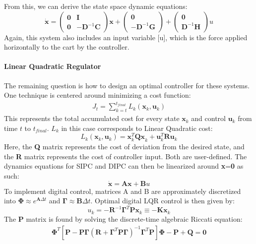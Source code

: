 \documentclass{article}
\theoremstyle{plain}
\theoremstyle{definition}
\theoremstyle{remark}
\begin{document}
From this, we can derive the state space dynamic equations:
\begin{equation}
    \label{DIPC_ODE}
    \dot{\textbf{x}} = \begin{pmatrix}
        \textbf{0} & \textbf{I} \\
        \textbf{0} & -\textbf{D}^{-1}\textbf{C}
    \end{pmatrix}\textbf{x} + \begin{pmatrix}
        \textbf{0} \\
        -\textbf{D}^{-1}\textbf{G}
    \end{pmatrix} + \begin{pmatrix}
        \textbf{0} \\
        \textbf{D}^{-1}\textbf{H}
    \end{pmatrix}u
\end{equation}
Again, this system also includes an input variable [u], which is the force applied horizontally to the cart by the controller.

\paragraph{Linear Quadratic Regulator}
The remaining question is how to design an optimal controller for these systems. One technique is centered around minimizing a cost function:
\begin{gather*}
    J_t=\sum_{k=t}^{t_{final}}L_k(\textbf{x}_k, \textbf{u}_k)
\end{gather*}
This represents the total accumulated cost for every state $\textbf{x}_k$ and control $\textbf{u}_k$ from time $t$ to $t_{final}$. $L_k$ in this case corresponds to Linear Quadratic cost:
\begin{equation}
    \label{LQR_cost}
    L_k(\textbf{x}_k,\textbf{u}_k) = \textbf{x}_k^T\textbf{Qx}_k+\textbf{u}_k^T\textbf{Ru}_k
\end{equation}
Here, the \textbf{Q} matrix represents the cost of deviation from the desired state, and the \textbf{R} matrix represents the cost of controller input. Both are user-defined. The dynamics equations for SIPC and DIPC can then be linearized around \textbf{x}=\textbf{0} as such:
\begin{equation}
    \label{LQR_lin}
    \dot{\textbf{x}}=\textbf{Ax}+\textbf{B}u
\end{equation}
To implement digital control, matrices A and B are approximately discretized into $\boldsymbol\Phi\approx e^{\textbf{A}\Delta t}$ and $\boldsymbol\Gamma\approx\textbf{B}\Delta t$. Optimal digital LQR control is then given by:
\begin{equation}
    \label{LQR_ctrl}
    u_k = -\textbf{R}^{-1}\boldsymbol\Gamma^T\textbf{Px}_k\equiv-\textbf{Kx}_k
\end{equation}
The \textbf{P} matrix is found by solving the discrete-time algebraic Riccati equation:
\begin{gather*}
    \boldsymbol\Phi^T[\textbf{P} - \textbf{P}\boldsymbol\Gamma(\textbf{R}+\boldsymbol\Gamma^T\textbf{P}\boldsymbol\Gamma)^{-1}\boldsymbol\Gamma^T\textbf{P}]\boldsymbol\Phi-\textbf{P}+\textbf{Q}=\textbf{0}
\end{gather*}
\end{document}
